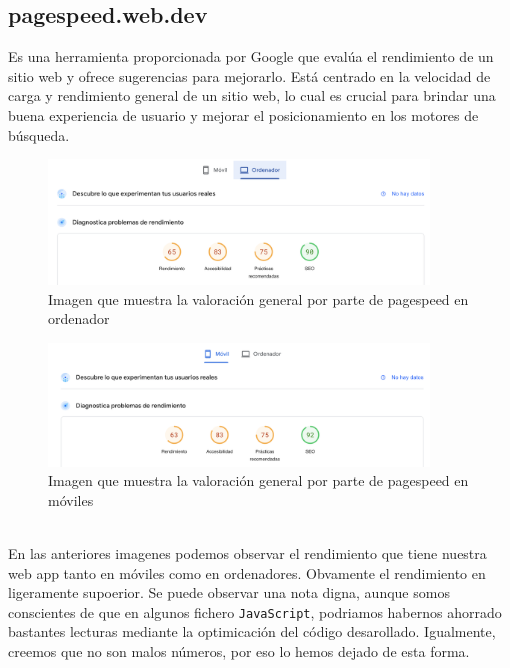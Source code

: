 \documentclass{article}
\begin{document}
\subsection{pagespeed.web.dev}
Es una herramienta proporcionada por Google que evalúa el rendimiento de un sitio web y ofrece sugerencias para mejorarlo. Está centrado en la velocidad de carga y rendimiento general de un sitio web, lo cual es crucial para brindar una buena experiencia de usuario y mejorar el posicionamiento en los motores de búsqueda.
\begin{figure}[ht]
    \centering
    \includegraphics[width=0.9\textwidth]{images/rendimiento.png}
    \caption{Imagen que muestra la valoración general por parte de pagespeed en ordenador}
\end{figure}
\begin{figure}[ht]
    \centering
    \includegraphics[width=0.9\textwidth]{images/rendimientoMobil.png}
    \caption{Imagen que muestra la valoración general por parte de pagespeed en móviles}
\end{figure}\\
En las anteriores imagenes podemos observar el rendimiento que tiene nuestra web app tanto en móviles como en ordenadores. Obvamente el rendimiento en ligeramente supoerior. Se puede observar una nota digna, aunque somos conscientes de que en algunos fichero \texttt{JavaScript}, podriamos habernos ahorrado bastantes lecturas mediante la optimicación del código desarollado. Igualmente, creemos que no son malos números, por eso lo hemos dejado de esta forma.
\end{document}
